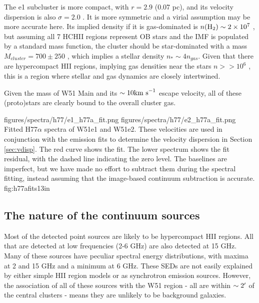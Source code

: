 The e1 subcluster is more compact, with $r=2.9$ \arcsec (0.07 pc), and its
velocity dispersion is also $\sigma=2.0$ \kms.  It is more symmetric and a virial
assumption may be more accurate here.  Its implied density if it is gas-dominated
is $n(\textrm{H}_{2})\sim2\times10^{7}$ \percc, but assuming all 7 HCHII regions represent OB
stars and the IMF is populated by a standard \citet{Kroupa2001a} mass function,
the cluster should be star-dominated with a mass $M_{cluster}=700\pm250$ \msun,
which implies a stellar density $n_* \sim 4 n_{gas}$.  Given that there are 
hypercompact HII regions, implying gas densities near the stars $n>>10^6$ \percc,
this is a region where stellar and gas dynamics are closely intertwined.

Given the mass of W51 Main and its $\sim10\textrm{km~s}^{-1}$ escape velocity, all of these
(proto)stars are clearly bound to the overall cluster gas. 

\FigureTwo
{figures/spectra/h77/e1_h77a_fit.png}
{figures/spectra/h77/e2_h77a_fit.png}
{Fitted H77$\alpha$ spectra of W51e1 and W51e2.  These velocities are used in
conjunction with the \formaldehyde emission fits to determine the velocity
dispersion in Section \ref{sec:vdisp}.
The red curve shows the fit.  The lower spectrum shows the fit residual, with
the dashed line indicating the zero level.  The baselines are imperfect, but we
have made no effort to subtract them during the spectral fitting, instead
assuming that the image-based continuum subtraction is accurate.
}
{fig:h77afits}{1}{3in}


\subsection{The nature of the continuum sources}
Most of the detected point sources are likely to be hypercompact HII regions.
All that are detected at low frequencies (2-6 GHz) are also detected at 15 GHz.
Many of these sources have peculiar spectral energy distributions, with maxima
at 2 and 15 GHz and a minimum at 6 GHz.  These SEDs are not easily explained by
either simple HII region models or as synchrotron emission sources.  However,
the association of all of these sources with the W51 region - all are within
$\sim2\mbox{$^\prime$}$ of the central clusters - means they are unlikely to be
background galaxies.  

